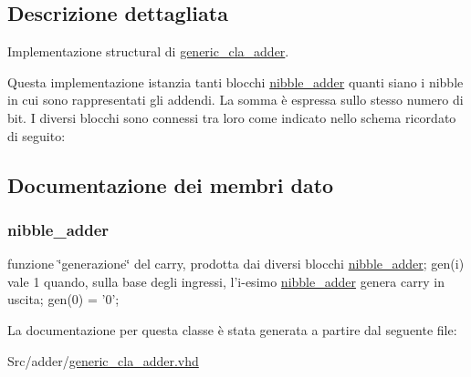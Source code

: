 \subsection{Descrizione dettagliata}
Implementazione structural di \hyperlink{classgeneric__cla__adder}{generic\+\_\+cla\+\_\+adder}. 

Questa implementazione istanzia tanti blocchi \hyperlink{classnibble__adder}{nibble\+\_\+adder} quanti siano i nibble in cui sono rappresentati gli addendi. La somma è espressa sullo stesso numero di bit. I diversi blocchi sono connessi tra loro come indicato nello schema ricordato di seguito\+:  

\subsection{Documentazione dei membri dato}
\hypertarget{classgeneric__cla__adder_1_1structural_a9d7a8a381439c61aea549e7a47ec7a6f}{
\subsubsection[{adder}]{ {\bfseries \textcolor{vhdlchar}{nibble\+\_\+adder}\textcolor{vhdlchar}{ }} \hspace{0.3cm}{\ttfamily [Instantiation]}}}\label{classgeneric__cla__adder_1_1structural_a9d7a8a381439c61aea549e7a47ec7a6f}


funzione \char`\"{}generazione\char`\"{} del carry, prodotta dai diversi blocchi \hyperlink{classnibble__adder}{nibble\+\_\+adder}; gen(i) vale 1 quando, sulla base degli ingressi, l'i-\/esimo \hyperlink{classnibble__adder}{nibble\+\_\+adder} genera carry in uscita; gen(0) = '0'; 



La documentazione per questa classe è stata generata a partire dal seguente file\+:\begin{DoxyCompactItemize}
\item 
Src/adder/\hyperlink{generic__cla__adder_8vhd}{generic\+\_\+cla\+\_\+adder.\+vhd}\end{DoxyCompactItemize}
